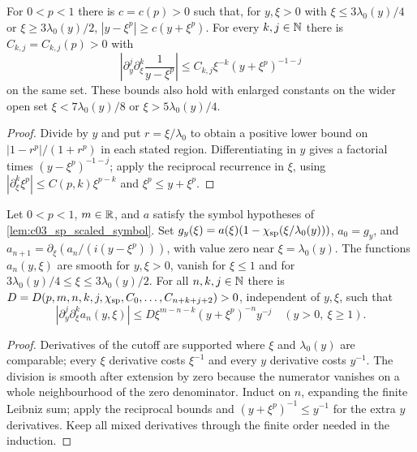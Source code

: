 \begin{lemma}
  \label{lem:c03_sp_far_phase_bounds}
  For $0<p<1$ there is $c=c(p)>0$ such that, for $y,\xi>0$ with
  $\xi\le3\lambda_0(y)/4$ or $\xi\ge3\lambda_0(y)/2$,
  $|y-\xi^p|\ge c(y+\xi^p)$.
  For every $k,j\in\mathbb{N}$ there is $C_{k,j}=C_{k,j}(p)>0$ with
  \[
    \left|\partial_y^j\partial_\xi^k\frac1{y-\xi^p}\right|
       \le C_{k,j}\xi^{-k}(y+\xi^p)^{-1-j}
  \]
  on the same set. These bounds also hold with enlarged constants on the wider open set
  $\xi<7\lambda_0(y)/8$ or $\xi>5\lambda_0(y)/4$.
\end{lemma}
\begin{proof}
  Divide by $y$ and put $r=\xi/\lambda_0$ to obtain a positive lower bound on
  $|1-r^p|/(1+r^p)$ in each stated region. Differentiating in $y$ gives a factorial
  times $(y-\xi^p)^{-1-j}$; apply the reciprocal recurrence in $\xi$, using
  $|\partial_\xi^k\xi^p|\le C(p,k)\xi^{p-k}$ and $\xi^p\le y+\xi^p$.
\end{proof}

\begin{lemma}
  \label{lem:c03_sp_far_symbol_iteration}
  Let $0<p<1$, $m\in\mathbb{R}$, and $a$ satisfy the symbol hypotheses of \cref{lem:c03_sp_scaled_symbol}.
  Set $g_y(\xi)=a(\xi)(1-\chi_{\rm sp}(\xi/\lambda_0(y)))$, $a_0=g_y$, and
  $a_{n+1}=\partial_\xi(a_n/(i(y-\xi^p)))$, with value zero near $\xi=\lambda_0(y)$.
  The functions $a_n(y,\xi)$ are smooth for $y,\xi>0$, vanish for $\xi\le1$ and
  for $3\lambda_0(y)/4\le\xi\le3\lambda_0(y)/2$.
  For all $n,k,j\in\mathbb{N}$ there is
  $D=D(p,m,n,k,j,\chi_{\rm sp},C_0,\ldots,C_{n+k+j+2})>0$, independent of $y,\xi$, such that
  \[
    |\partial_y^j\partial_\xi^k a_n(y,\xi)|
       \le D\xi^{m-n-k}(y+\xi^p)^{-n}y^{-j}
       \quad(y>0,\ \xi\ge1).
  \]
\end{lemma}
\begin{proof}
  Derivatives of the cutoff are supported where $\xi$ and $\lambda_0(y)$ are comparable;
  every $\xi$ derivative costs $\xi^{-1}$ and every $y$ derivative costs $y^{-1}$.
  The division is smooth after extension by zero because the numerator vanishes on a whole
  neighbourhood of the zero denominator. Induct on $n$, expanding the finite Leibniz sum;
  apply the reciprocal bounds and $(y+\xi^p)^{-1}\le y^{-1}$ for the extra $y$ derivatives.
  Keep all mixed derivatives through the finite order needed in the induction.
\end{proof}

